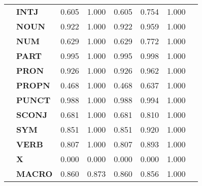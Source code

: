 \begin{longtable}{|l||l||l||l||l||l||l||l|}
\textbf{} & \textbf{INTJ} & 0.605 & 1.000 & 0.605 & 0.754 & 1.000 \\
\textbf{} & \textbf{NOUN} & 0.922 & 1.000 & 0.922 & 0.959 & 1.000 \\
\textbf{} & \textbf{NUM} & 0.629 & 1.000 & 0.629 & 0.772 & 1.000 \\
\textbf{} & \textbf{PART} & 0.995 & 1.000 & 0.995 & 0.998 & 1.000 \\
\textbf{} & \textbf{PRON} & 0.926 & 1.000 & 0.926 & 0.962 & 1.000 \\
\textbf{} & \textbf{PROPN} & 0.468 & 1.000 & 0.468 & 0.637 & 1.000 \\
\textbf{} & \textbf{PUNCT} & 0.988 & 1.000 & 0.988 & 0.994 & 1.000 \\
\textbf{} & \textbf{SCONJ} & 0.681 & 1.000 & 0.681 & 0.810 & 1.000 \\
\textbf{} & \textbf{SYM} & 0.851 & 1.000 & 0.851 & 0.920 & 1.000 \\
\textbf{} & \textbf{VERB} & 0.807 & 1.000 & 0.807 & 0.893 & 1.000 \\
\textbf{} & \textbf{X} & 0.000 & 0.000 & 0.000 & 0.000 & 1.000 \\
\textbf{} & \textbf{MACRO} & 0.860 & 0.873 & 0.860 & 0.856 & 1.000 \\
\cline{1-7}
\end{longtable}
